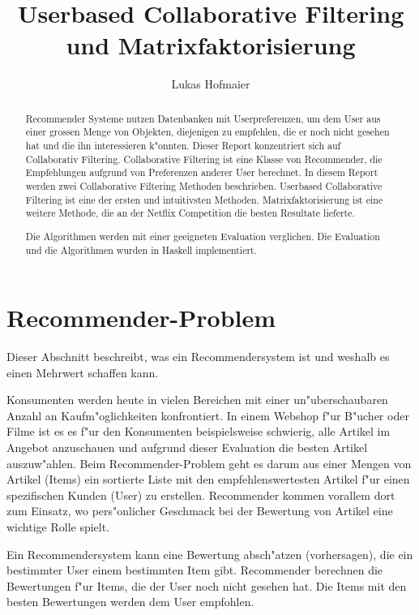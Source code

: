 \documentclass[a4paper, 12pt]{article}
\author{Lukas Hofmaier}
\title{Userbased Collaborative Filtering und Matrixfaktorisierung}
\begin{document}
\lstset{basicstyle=\small,
language=Haskell,
stringstyle=ttfamiliy
}

\maketitle
\newpage
\tableofcontents
\newpage
\begin{abstract}
 Recommender Systeme nutzen Datenbanken mit Userpreferenzen, um dem User aus einer grossen Menge von Objekten, diejenigen zu empfehlen, die er noch nicht gesehen hat und die ihn interessieren k"onnten. Dieser Report konzentriert sich auf Collaborativ Filtering. Collaborative Filtering ist eine Klasse von Recommender, die Empfehlungen aufgrund von Preferenzen anderer User berechnet.
In diesem Report werden zwei Collaborative Filtering Methoden beschrieben. Userbased Collaborative Filtering ist eine der ersten und intuitivsten Methoden. Matrixfaktorisierung ist eine weitere Methode, die an der Netflix Competition die besten Resultate lieferte.

Die Algorithmen werden mit einer geeigneten Evaluation verglichen. Die Evaluation und die Algorithmen wurden in Haskell implementiert.

\end{abstract}

\section{Recommender-Problem}
\label{sec:problem}
Dieser Abschnitt beschreibt, was ein Recommendersystem ist und weshalb es einen Mehrwert schaffen kann.

Konsumenten werden heute in vielen Bereichen mit einer un"uberschaubaren Anzahl an Kaufm"oglichkeiten konfrontiert. In einem Webshop f"ur B"ucher oder Filme ist es es f"ur den Konsumenten beispielsweise schwierig, alle Artikel im Angebot anzuschauen und aufgrund dieser Evaluation die besten Artikel auszuw"ahlen. Beim Recommender-Problem geht es darum aus einer Mengen von Artikel (Items) ein sortierte Liste mit den empfehlenswertesten Artikel f"ur einen spezifischen Kunden (User) zu erstellen. Recommender kommen vorallem dort zum Einsatz, wo pers"onlicher Geschmack bei der Bewertung von Artikel eine wichtige Rolle spielt.

Ein Recommendersystem kann eine Bewertung absch"atzen (vorhersagen), die ein bestimmter User einem bestimmten Item gibt. Recommender berechnen die Bewertungen f"ur Items, die der User noch nicht gesehen hat. Die Items mit den besten Bewertungen werden dem User empfohlen.
\end{document}
